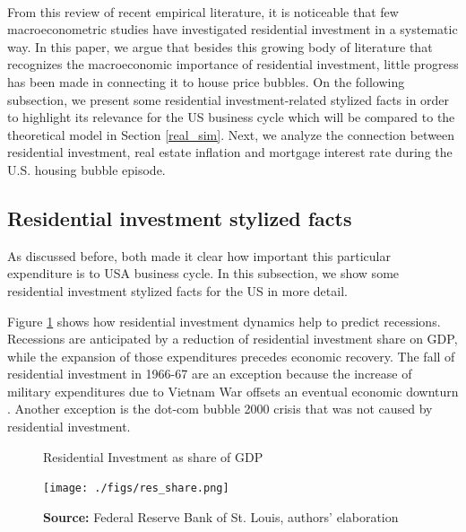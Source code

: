\documentclass[12pt, a4]{article}
\begin{document}
\\
From this review of recent empirical literature, it is noticeable that few macroeconometric studies have investigated residential investment in a systematic way.
In this paper, we argue that besides this growing body of literature that recognizes the macroeconomic importance of residential investment, little progress has been made in connecting  it to house price bubbles.
On the following subsection, we present some residential investment-related stylized facts in order to highlight its relevance for the US business cycle which will be compared to the theoretical model in Section \ref{real_sim}.
Next, we analyze the connection between residential investment, real estate inflation and mortgage interest rate during the U.S. housing bubble episode.

\subsection{Residential investment stylized facts}
\label{sec:org89db002}

As discussed before, both \textcites{green_follow_1997}{leamer_housing_2007} made it clear how important this particular expenditure is to USA business cycle. In this subsection, we show some residential investment stylized facts for the US in more detail.

Figure \ref{Investo_Resid_GDP} shows how residential investment dynamics help to predict recessions. Recessions are anticipated by a reduction of residential investment share on GDP, while the expansion of those expenditures precedes economic recovery. The fall of residential investment in 1966-67 are an exception because the increase of military expenditures due to Vietnam War offsets an eventual economic downturn \cite[p.~20]{leamer_housing_2007}. Another exception is the dot-com bubble 2000 crisis that was not caused by residential investment.



\begin{figure}[htb]
    \centering
        \caption{Residential Investment as share of GDP}
        \label{Investo_Resid_GDP}
    \texttt{[image: ./figs/res\_share.png]}
    \caption*{\textbf{Source:} Federal Reserve Bank of St. Louis, authors’ elaboration}
\end{figure}
\end{document}
